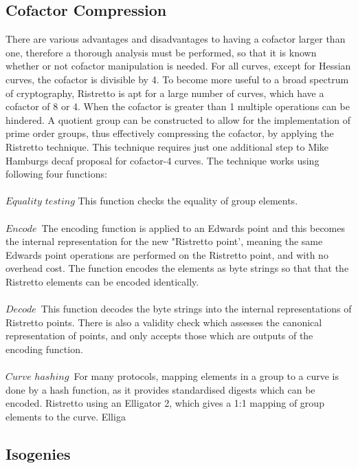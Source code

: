 \documentclass{article}
\theoremstyle{definition}
\theoremstyle{remark}
\begin{document}
	\subsection{Cofactor Compression}
	
	There are various advantages and disadvantages to having a cofactor larger than one, therefore a thorough analysis must be performed,  so that it is known whether or not cofactor manipulation is needed. For all curves, except for Hessian curves, the cofactor is divisible by 4. To become more useful to a broad spectrum of cryptography, Ristretto is apt for a large number of curves, which have a cofactor of 8 or 4. When the cofactor is greater than 1 multiple operations can be hindered. A quotient group can be constructed to allow for the implementation of prime order groups, thus effectively compressing the cofactor, by applying the Ristretto technique. This technique requires just one additional step to Mike Hamburgs decaf proposal for cofactor-4 curves. The technique works using following four functions:\\\\   
	
	${Equality}$ ${testing}$ This function checks the equality of group elements. \\\\
	
	${Encode}$\ The encoding function is applied to an Edwards point and this becomes the internal representation for the new "Ristretto point', meaning the same Edwards point operations are performed on the Ristretto point, and with no overhead cost. The function encodes the elements as byte strings so that that the Ristretto elements can be encoded identically.\\\\
	
	${Decode}$\ This function decodes the byte strings into the internal representations of Ristretto points. There is also a validity check which assesses the canonical representation of points, and only accepts those which are outputs of the encoding function. \\\\
	
	${Curve}$ ${hashing}$\ For many protocols, mapping elements in a group to a curve is done by a hash function, as it provides standardised digests which can be encoded. Ristretto using an Elligator 2, which gives a 1:1 mapping of group elements to the curve. Elliga
	
	\subsection{Isogenies}
	
\end{document}
